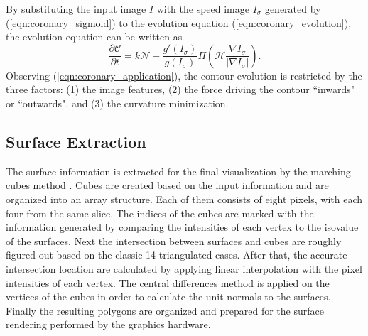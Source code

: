 By substituting the input image $I$ with the speed image $I_{\sigma}$ generated by (\ref{eqn:coronary_sigmoid}) to the evolution equation (\ref{eqn:coronary_evolution}), the evolution equation can be written as
\begin{equation}
\label{eqn:coronary_application}
\frac{\partial \mathcal{C}}{\partial t} = k \mathcal{N} - \frac{g'(I_{\sigma})}{g(I_{\sigma})} \varPi \left( \mathcal{H} \frac{\nabla I_{\sigma}}{ \left| \nabla I_{\sigma} \right| } \right).%
\end{equation}
Observing (\ref{eqn:coronary_application}), the contour evolution is restricted by the three factors: (1) the image features, (2) the force driving the contour ``inwards" or ``outwards", and (3) the curvature minimization.

\subsection{Surface Extraction}
\label{coronary_surface_extraction}

The surface information is extracted for the final visualization by the marching cubes method \cite{Lorensen1987MC}.
Cubes are created based on the input information and are organized into an array structure.
Each of them consists of eight pixels, with each four from the same slice.
The indices of the cubes are marked with the information generated by comparing the intensities of each vertex to the isovalue of the surfaces.
Next the intersection between surfaces and cubes are roughly figured out based on the classic 14 triangulated cases.
After that, the accurate intersection location are calculated by applying linear interpolation with the pixel intensities of each vertex.
The central differences method is applied on the vertices of the cubes in order to calculate the unit normals to the surfaces.
Finally the resulting polygons are organized and prepared for the surface rendering performed by the graphics hardware.
